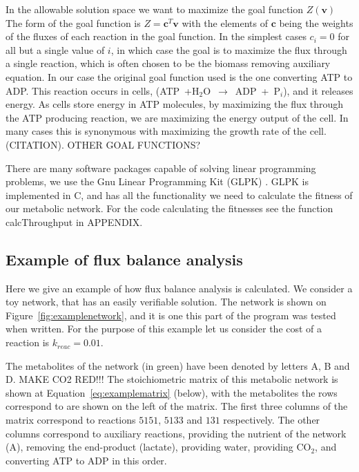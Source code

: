 \documentclass[10pt,a4paper]{article}
\begin{document}
	In the allowable solution space we want to maximize the goal function $Z \left( \mathbf{v} \right)$ The form of the goal function is $Z=\mathbf{c}^T \mathbf{v}$ with the elements of $\mathbf{c}$ being the weights of the fluxes of each reaction in the goal function. In the simplest cases $c_i=0$ for all but a single value of $i$, in which case the goal is to maximize the flux through a single reaction, which is often chosen to be the biomass removing auxiliary equation. In our case the original goal function used is the one converting ATP to ADP. This reaction occurs in cells, (ATP~+H$_2$O~$\rightarrow$~ADP~+~P$_i$), and it releases energy. As cells store energy in ATP molecules,  by maximizing the flux through the ATP producing reaction, we are maximizing the energy output of the cell. In many cases this is synonymous with maximizing the growth rate of the cell. (CITATION). OTHER GOAL FUNCTIONS?
	
	There are many software packages capable of solving linear programming problems, we use the Gnu Linear Programming Kit (GLPK) \cite{glpk}. GLPK is implemented in C, and has all the functionality we need to calculate the fitness of our metabolic network. For the code calculating the fitnesses see the function calcThroughput in APPENDIX.


\subsection{Example of flux balance analysis}
\label{sub:example_of_flux_balance_analysis}

Here we give an example of how flux balance analysis is calculated. We consider a toy network, that has an easily verifiable solution. The network is shown on Figure~\ref{fig:examplenetwork}, and it is one this part of the program was tested when written. For the purpose of this example let us consider the cost of a reaction is $k_{reac}=0.01$.


	The metabolites of the network (in green) have been denoted by letters A, B and D. MAKE CO2 RED!!! The stoichiometric matrix of this metabolic network is shown at Equation~\ref{eq:examplematrix} (below), with the metabolites the rows correspond to are shown on the left of the matrix. The first three columns of the matrix correspond to reactions $5151$, $5133$ and $131$ respectively. The other columns correspond to auxiliary reactions, providing the nutrient of the network (A), removing the end-product (lactate), providing water, providing CO$_2$, and converting ATP to ADP in this order.
\end{document}

